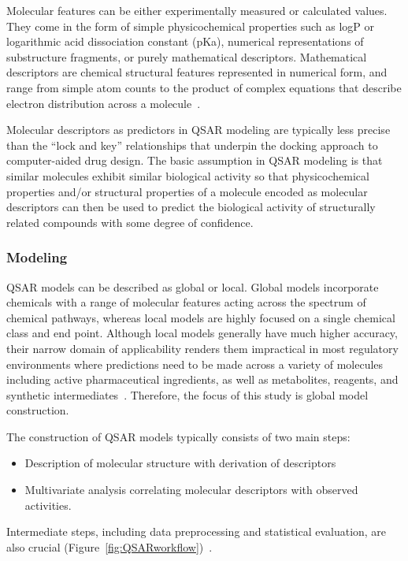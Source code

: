 Molecular features can be either experimentally measured or calculated values. They come in the form of simple physicochemical properties such as logP or logarithmic acid dissociation constant (pKa), numerical representations of substructure fragments, or purely mathematical descriptors. Mathematical descriptors are chemical structural features represented in numerical form, and range from simple atom counts to the product of complex equations that describe electron distribution across a molecule~\cite{Kruhlak2012}.

Molecular descriptors as predictors in QSAR modeling are typically less precise than the “lock and key” relationships that underpin the docking approach to computer-aided drug design. The basic assumption in QSAR modeling is that similar molecules exhibit similar biological activity so that physicochemical properties and/or structural properties of a molecule encoded as molecular descriptors can then be used to predict the biological activity of structurally related compounds with some degree of confidence.

\subsubsection{Modeling}
QSAR models can be described as global or local. Global models incorporate chemicals with a range of molecular features acting across the spectrum of chemical pathways, whereas local models are highly focused on a single chemical class and end point. Although local models generally have much higher accuracy, their narrow domain of applicability renders them impractical in most regulatory environments where predictions need to be made across a variety of molecules including active pharmaceutical ingredients, as well as metabolites, reagents, and synthetic intermediates~\cite{Kruhlak2012}. Therefore, the focus of this study is global model construction.

The construction of QSAR models typically consists of two main steps:
\begin{itemize}
\item Description of molecular structure with derivation of descriptors
\item Multivariate analysis correlating molecular descriptors with observed activities. 
\end{itemize}
Intermediate steps, including data preprocessing and statistical evaluation, are also crucial (Figure~\ref{fig:QSARworkflow})~\cite{Nantasenamat2009}.

